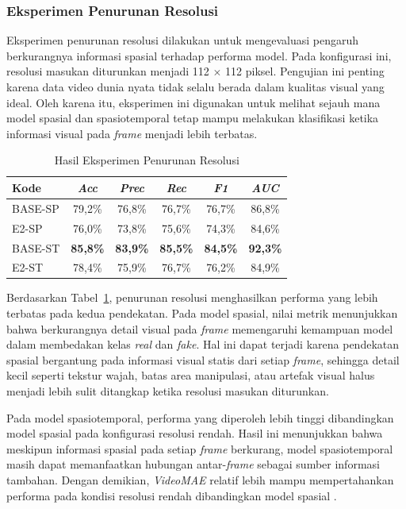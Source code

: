 \subsubsection{Eksperimen Penurunan Resolusi} \label{IV.Eksperimen_Utama_Resolusi}

Eksperimen penurunan resolusi dilakukan untuk mengevaluasi pengaruh berkurangnya informasi spasial terhadap performa model. Pada konfigurasi ini, resolusi masukan diturunkan menjadi 112 $\times$ 112 piksel. Pengujian ini penting karena data video dunia nyata tidak selalu berada dalam kualitas visual yang ideal. Oleh karena itu, eksperimen ini digunakan untuk melihat sejauh mana model spasial dan spasiotemporal tetap mampu melakukan klasifikasi ketika informasi visual pada \textit{frame} menjadi lebih terbatas.

\begin{table}[htbp]
\centering
\caption{Hasil Eksperimen Penurunan Resolusi}
\label{table:4.eksperimen-utama-resolusi}
\begin{tabular}{lccccc}
\toprule
\textbf{Kode} &
\textbf{\textit{Acc}} &
\textbf{\textit{Prec}} &
\textbf{\textit{Rec}} &
\textbf{\textit{F1}} &
\textbf{\textit{AUC}} \\
\midrule
BASE-SP & 79,2\% & 76,8\% & 76,7\% & 76,7\% & 86,8\% \\
E2-SP & 76,0\% & 73,8\% & 75,6\% & 74,3\% & 84,6\% \\
\midrule
BASE-ST & \textbf{85,8\%} & \textbf{83,9\%} & \textbf{85,5\%} & \textbf{84,5\%} & \textbf{92,3\%} \\
E2-ST & 78,4\% & 75,9\% & 76,7\% & 76,2\% & 84,9\% \\
\bottomrule
\end{tabular}
\end{table}

Berdasarkan Tabel~\ref{table:4.eksperimen-utama-resolusi}, penurunan resolusi menghasilkan performa yang lebih terbatas pada kedua pendekatan. Pada model spasial, nilai metrik menunjukkan bahwa berkurangnya detail visual pada \textit{frame} memengaruhi kemampuan model dalam membedakan kelas \textit{real} dan \textit{fake}. Hal ini dapat terjadi karena pendekatan spasial bergantung pada informasi visual statis dari setiap \textit{frame}, sehingga detail kecil seperti tekstur wajah, batas area manipulasi, atau artefak visual halus menjadi lebih sulit ditangkap ketika resolusi masukan diturunkan.

Pada model spasiotemporal, performa yang diperoleh lebih tinggi dibandingkan model spasial pada konfigurasi resolusi rendah. Hasil ini menunjukkan bahwa meskipun informasi spasial pada setiap \textit{frame} berkurang, model spasiotemporal masih dapat memanfaatkan hubungan antar-\textit{frame} sebagai sumber informasi tambahan. Dengan demikian, \textit{VideoMAE} relatif lebih mampu mempertahankan performa pada kondisi resolusi rendah dibandingkan model spasial \cite{Gu2021}\cite{tong2022videomaemaskedautoencodersdataefficient}.

